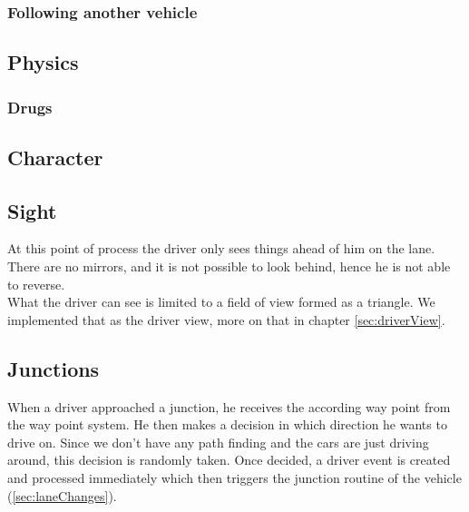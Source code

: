 \subsubsection{Following another vehicle}

% 

\subsection{Physics}
\label{sec:physics}

\subsubsection{Drugs}
\label{sec:drugs}

\subsection{Character}
\label{sec:character}

\subsection{Sight}
\label{sec:sight}

At this point of process the driver only sees things ahead of him on the
lane. There are no mirrors, and it is not possible to look behind, hence
he is not able to reverse.\\

\noindent What the driver can see is limited to a field of view formed as 
a triangle.  We implemented that as the driver view, more on that in chapter 
\ref{sec:driverView}.

\subsection{Junctions}
\label{sec:driverJunctions}

When a driver approached a junction, he receives the according way point
from the way point system. He then makes a decision in which direction he
wants to drive on. Since we don't have any path finding and the cars are
just driving around, this decision is randomly taken. Once decided, a
driver event is created and processed immediately which then triggers
the junction routine of the vehicle (\ref{sec:laneChanges}).

